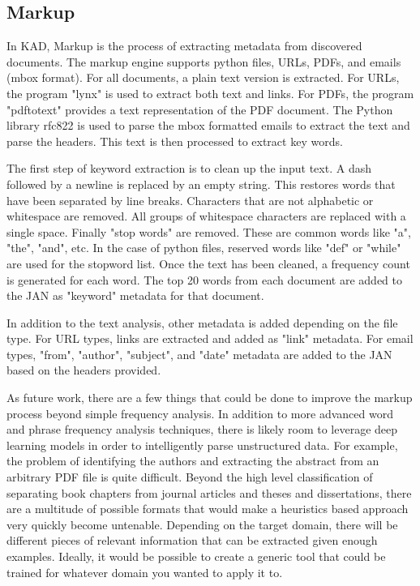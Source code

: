 \documentclass{article}
\begin{document}
\begin{doublespace}
\section{Markup}
In KAD, Markup is the process of extracting metadata from discovered documents.
The markup engine supports python files, URLs, PDFs, and emails (mbox format).
For all documents, a plain text version is extracted.
For URLs, the program "lynx" is used to extract both text and links.
For PDFs, the program "pdftotext" provides a text representation of the PDF document.
The Python library rfc822 is used to parse the mbox formatted emails to extract the text and parse the headers.
This text is then processed to extract key words.
\par
The first step of keyword extraction is to clean up the input text.
A dash followed by a newline is replaced by an empty string.  This restores words that have been separated by line breaks.
Characters that are not alphabetic or whitespace are removed.
All groups of whitespace characters are replaced with a single space.
Finally "stop words" are removed. These are common words like "a", "the", "and", etc.
In the case of python files, reserved words like "def" or "while" are used for the stopword list.
Once the text has been cleaned, a frequency count is generated for each word.
The top 20 words from each document are added to the JAN as "keyword" metadata for that document.
\par
In addition to the text analysis, other metadata is added depending on the file type.
For URL types, links are extracted and added as "link" metadata.
For email types, "from", "author", "subject", and "date" metadata are added to the JAN based on the headers provided.
\par
As future work, there are a few things that could be done to improve the markup process beyond simple frequency analysis.
In addition to more advanced word and phrase frequency analysis techniques,
there is likely room to leverage deep learning models in order to intelligently parse unstructured data.
For example, the problem of identifying the authors and extracting the abstract from an arbitrary PDF file is quite difficult.
Beyond the high level classification of separating book chapters from journal articles and theses and dissertations, there are a multitude of possible formats
that would make a heuristics based approach very quickly become untenable.
Depending on the target domain, there will be different pieces of relevant information that can be extracted given enough examples.
Ideally, it would be possible to create a generic tool that could be trained for whatever domain you wanted to apply it to.
\end{doublespace}
\end{document}
